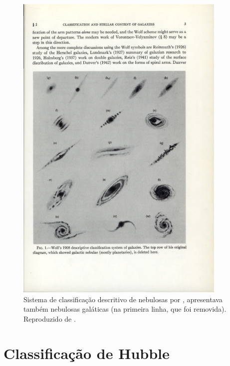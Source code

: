 \begin{figure}
	\includegraphics[width=0.9\textwidth]{figuras/WolfEarlyClass}
	\caption[Classificação de Wolf]
	{Sistema de classificação descritivo de nebulosas por \citet{Wolf1908},
	apresentava também nebulosas galáticas (na primeira linha, que foi removida).
	Reproduzido de \citet{Sandage1975}.}
	\label{fig:WolfEarlyClass}
\end{figure}



\section{Classificação de Hubble}

